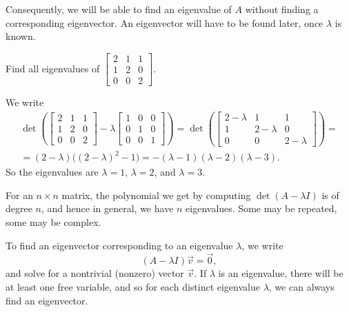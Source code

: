 \documentclass{ximera}
\begin{document}
Consequently, we will be able to find an eigenvalue of $A$ without finding a corresponding eigenvector.  An eigenvector will have to be found later, once $\lambda$ is known.

\begin{example}
    Find all eigenvalues of 
    $\left[ 
        \begin{smallmatrix}
            2 & 1 & 1 \\
            1 & 2 & 0 \\
            0 & 0 & 2
        \end{smallmatrix} 
    \right]$.
\end{example}

\begin{exampleSol}
    We write
    \begin{multline*}
        \det \left(
        \begin{bmatrix}
            2 & 1 & 1 \\
            1 & 2 & 0 \\
            0 & 0 & 2
        \end{bmatrix}
        - \lambda 
        \begin{bmatrix}
            1 & 0 & 0 \\
            0 & 1 & 0 \\
            0 & 0 & 1
        \end{bmatrix}
        \right) = \det \left(
        \begin{bmatrix}
            2-\lambda & 1 & 1 \\
            1 & 2-\lambda & 0 \\
            0 & 0 & 2-\lambda
        \end{bmatrix}
        \right) = \\
        = (2-\lambda) \bigl({(2-\lambda)}^2 - 1\bigr)
        = -(\lambda -1)(\lambda -2)(\lambda-3) .
    \end{multline*}
    So the eigenvalues are $\lambda = 1$, $\lambda = 2$, and $\lambda = 3$.
\end{exampleSol}

For an $n \times n$ matrix, the polynomial we get by computing $\det(A - \lambda I)$ is of degree $n$, and hence in general, we have $n$ eigenvalues.  Some may be repeated, some may be complex.

To find an eigenvector corresponding to an eigenvalue $\lambda$, we write
\begin{equation*}
    (A-\lambda I) \vec{v} = \vec{0} ,
\end{equation*}
and solve for a nontrivial (nonzero) vector $\vec{v}$. If $\lambda$ is an eigenvalue, there will be at least one free variable, and so for each distinct eigenvalue $\lambda$, we can always find an eigenvector.
\end{document}
